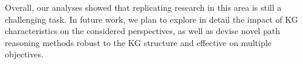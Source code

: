 \documentclass[runningheads]{llncs}
\begin{document}
Overall, our analyses showed that replicating research in this area is still a challenging task.
In future work, we plan to explore in detail the impact of KG characteristics on the considered perspectives, as well as
devise novel path reasoning methods robust to the KG structure and effective on multiple objectives. 



\end{document}
